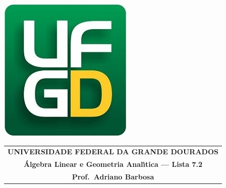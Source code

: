 \documentclass[a4paper,5pt]{amsbook}
\begin{document}
\thispagestyle{empty}
\pagestyle{empty}
\begin{minipage}[h]{0.14\textwidth}
	\includegraphics[scale=0.24]{../../ufgd.png}
\end{minipage}
\begin{minipage}[h]{\textwidth}
\begin{tabular}{c}
{{\bf UNIVERSIDADE FEDERAL DA GRANDE DOURADOS}}\\
{{\bf \'{A}lgebra Linear e Geometria Anal\'{\i}tica --- Lista 7.2}}\\
{{\bf Prof.\ Adriano Barbosa}}\\
\end{tabular}
\vspace{-0.45cm}
%
\end{minipage}

\end{document}
